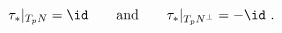 \begin{equation*}
  \tau_*|_{T_pN} = \id \qquad\text{and}\qquad 
  \tau_*|_{T_pN^\perp} = -\id~.
\end{equation*}

